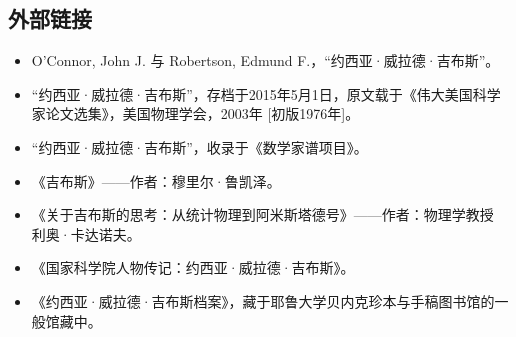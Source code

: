 \subsection{外部链接}
\begin{itemize}
\item O'Connor, John J. 与 Robertson, Edmund F.，“约西亚·威拉德·吉布斯”。
\item “约西亚·威拉德·吉布斯”，存档于2015年5月1日，原文载于《伟大美国科学家论文选集》，美国物理学会，2003年 [初版1976年]。
\item “约西亚·威拉德·吉布斯”，收录于《数学家谱项目》。
\item 《吉布斯》——作者：穆里尔·鲁凯泽。
\item 《关于吉布斯的思考：从统计物理到阿米斯塔德号》——作者：物理学教授 利奥·卡达诺夫。
\item 《国家科学院人物传记：约西亚·威拉德·吉布斯》。
\item 《约西亚·威拉德·吉布斯档案》，藏于耶鲁大学贝内克珍本与手稿图书馆的一般馆藏中。
\end{itemize}